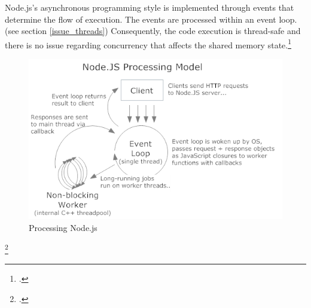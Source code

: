 Node.js's asynchronous programming style is implemented through events that determine the flow of execution. The events are processed within an event loop. (see section \ref{issue_threads}) Consequently, the code execution is thread-safe and there is no issue regarding concurrency that affects the shared memory state.\footcite[Cf.][p.16]{teixeira_2012}\\

\begin{figure}[hbtp]
\centering
\includegraphics[width=\textwidth]{img/processing_model.png}
\caption[Processing Node.js]{Processing Node.js\footnotemark}
\label{fig:processing_model}
\end{figure}
\footcitetext{aaronstannard_2011}

